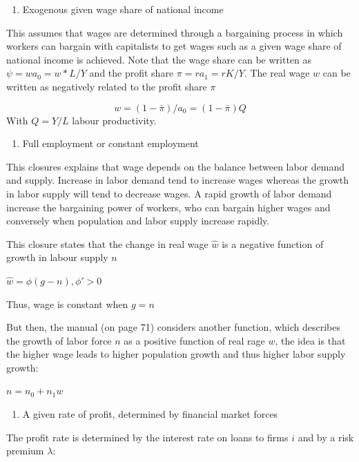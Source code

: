 \documentclass[
  letterpaper,
  DIV=11,
  numbers=noendperiod]{scrreprt}
\providecommand{\tightlist}{%
  \setlength{\itemsep}{0pt}\setlength{\parskip}{0pt}}\usepackage{longtable,booktabs,array}
\begin{document}
\begin{enumerate}
\def\labelenumi{\arabic{enumi}.}
\setcounter{enumi}{1}
\tightlist
\item
  Exogenous given wage share of national income
\end{enumerate}

This assumes that wages are determined through a bargaining process in
which workers can bargain with capitalists to get wages such as a given
wage share of national income is achieved. Note that the wage share can
be written as \(\psi = wa_0 = w*L/Y\) and the profit share
\(\pi = ra_1=rK/Y\). The real wage \(w\) can be written as negatively
related to the profit share \(\pi\)

\[
w = (1 - \bar{\pi})/a_0 = (1 - \bar{\pi})Q
\] With \(Q=Y/L\) labour productivity.

\begin{enumerate}
\def\labelenumi{\arabic{enumi}.}
\setcounter{enumi}{2}
\tightlist
\item
  Full employment or constant employment
\end{enumerate}

This closures explains that wage depends on the balance between labor
demand and supply. Increase in labor demand tend to increase wages
whereas the growth in labor supply will tend to decrease wages. A rapid
growth of labor demand increase the bargaining power of workers, who can
bargain higher wages and conversely when population and labor supply
increase rapidly.

This closure states that the change in real wage \(\hat{w}\) is a
negative function of growth in labour supply \(n\)

\(\hat{w} = \phi(g - n), \phi'>0\)

Thus, wage is constant when \(g = n\)

But then, the manual (on page 71) considers another function, which
describes the growth of labor force \(n\) as a positive function of real
rage \(w\), the idea is that the higher wage leads to higher population
growth and thus higher labor supply growth:

\(n = n_0 + n_1w\)

\begin{enumerate}
\def\labelenumi{\arabic{enumi}.}
\setcounter{enumi}{3}
\tightlist
\item
  A given rate of profit, determined by financial market forces
\end{enumerate}

The profit rate is determined by the interest rate on loans to firms
\(i\) and by a risk premium \(\lambda\):
\end{document}
